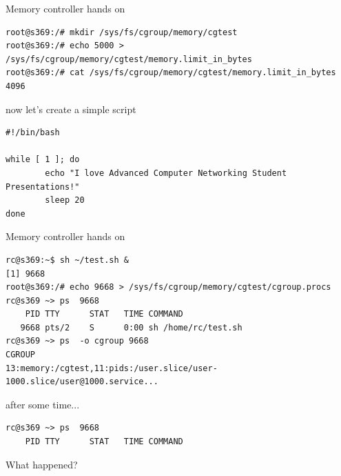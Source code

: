 \documentclass[
  english,          
  aspectratio=169,    %
]{tumbeamer}
\begin{document}
\begin{frame}[fragile]{Memory controller hands on}
\begin{verbatim}
root@s369:/# mkdir /sys/fs/cgroup/memory/cgtest
root@s369:/# echo 5000 > /sys/fs/cgroup/memory/cgtest/memory.limit_in_bytes
root@s369:/# cat /sys/fs/cgroup/memory/cgtest/memory.limit_in_bytes 
4096
\end{verbatim}
\vspace{3mm}
now let's create a simple script 
\vspace{3mm}

\begin{verbatim}
#!/bin/bash

while [ 1 ]; do
        echo "I love Advanced Computer Networking Student Presentations!"
        sleep 20
done
\end{verbatim}

\end{frame}
\begin{frame}[fragile]{Memory controller hands on}
\begin{verbatim}
rc@s369:~$ sh ~/test.sh &
[1] 9668
root@s369:/# echo 9668 > /sys/fs/cgroup/memory/cgtest/cgroup.procs
rc@s369 ~> ps  9668
    PID TTY      STAT   TIME COMMAND
   9668 pts/2    S      0:00 sh /home/rc/test.sh
rc@s369 ~> ps  -o cgroup 9668
CGROUP
13:memory:/cgtest,11:pids:/user.slice/user-1000.slice/user@1000.service...
\end{verbatim}
\vspace{3mm}
after some time... 
\vspace{3mm}

\begin{verbatim}
rc@s369 ~> ps  9668
    PID TTY      STAT   TIME COMMAND
\end{verbatim}

What happened?
\end{frame}
\end{document}
